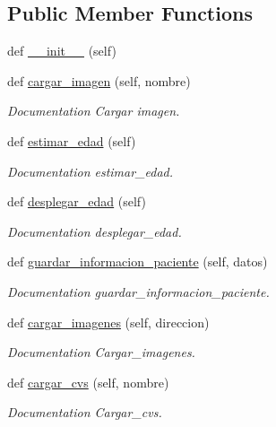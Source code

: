 \subsection*{Public Member Functions}
\begin{DoxyCompactItemize}
\item 
def \mbox{\hyperlink{class_facade_1_1_facade_ad3ab1700c8824f9711bb33c34187f2b4}{\+\_\+\+\_\+init\+\_\+\+\_\+}} (self)
\item 
def \mbox{\hyperlink{class_facade_1_1_facade_ab29afbe3462ddbb2e6d8203d20f610ae}{cargar\+\_\+imagen}} (self, nombre)
\begin{DoxyCompactList}\small\item\em Documentation Cargar imagen. \end{DoxyCompactList}\item 
def \mbox{\hyperlink{class_facade_1_1_facade_a31c82e317bb43cffa46140c2826a908b}{estimar\+\_\+edad}} (self)
\begin{DoxyCompactList}\small\item\em Documentation estimar\+\_\+edad. \end{DoxyCompactList}\item 
def \mbox{\hyperlink{class_facade_1_1_facade_a92d3a050a1526997ed8d0c080c016b77}{desplegar\+\_\+edad}} (self)
\begin{DoxyCompactList}\small\item\em Documentation desplegar\+\_\+edad. \end{DoxyCompactList}\item 
def \mbox{\hyperlink{class_facade_1_1_facade_a1bf0fe7872a81826af422d1efeccef92}{guardar\+\_\+informacion\+\_\+paciente}} (self, datos)
\begin{DoxyCompactList}\small\item\em Documentation guardar\+\_\+informacion\+\_\+paciente. \end{DoxyCompactList}\item 
def \mbox{\hyperlink{class_facade_1_1_facade_a1771449006d9324bae3c3449f59b8fe6}{cargar\+\_\+imagenes}} (self, direccion)
\begin{DoxyCompactList}\small\item\em Documentation Cargar\+\_\+imagenes. \end{DoxyCompactList}\item 
def \mbox{\hyperlink{class_facade_1_1_facade_ad01d3a1108a539ada2d0615c53b160de}{cargar\+\_\+cvs}} (self, nombre)
\begin{DoxyCompactList}\small\item\em Documentation Cargar\+\_\+cvs. \end{DoxyCompactList}\item 

\end{DoxyCompactItemize}
